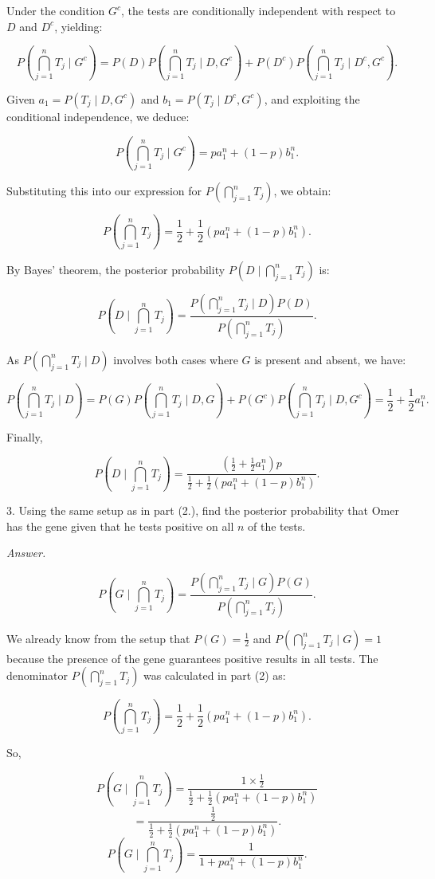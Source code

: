 \documentclass[12pt]{article}
\begin{document}
Under the condition \(G^c\), the tests are conditionally independent with respect to \(D\) and \(D^c\), yielding:

\[ P(\bigcap_{j=1}^n T_j \mid G^c) = P(D)P(\bigcap_{j=1}^n T_j \mid D, G^c) + P(D^c)P(\bigcap_{j=1}^n T_j \mid D^c, G^c). \]

Given \(a_1 = P(T_j \mid D, G^c)\) and \(b_1 = P(T_j \mid D^c, G^c)\), and exploiting the conditional independence, we deduce:

\[ P(\bigcap_{j=1}^n T_j \mid G^c) = pa_1^n + (1-p)b_1^n. \]

Substituting this into our expression for \(P(\bigcap_{j=1}^n T_j)\), we obtain:

\[ P(\bigcap_{j=1}^n T_j) = \frac{1}{2} + \frac{1}{2}(pa_1^n + (1-p)b_1^n). \]

By Bayes' theorem, the posterior probability \(P(D \mid \bigcap_{j=1}^n T_j)\) is:

\[ P(D \mid \bigcap_{j=1}^n T_j) = \frac{P(\bigcap_{j=1}^n T_j \mid D)P(D)}{P(\bigcap_{j=1}^n T_j)}. \]

As \(P(\bigcap_{j=1}^n T_j \mid D)\) involves both cases where \(G\) is present and absent, we have:

\[ P(\bigcap_{j=1}^n T_j \mid D) = P(G)P(\bigcap_{j=1}^n T_j \mid D, G) + P(G^c)P(\bigcap_{j=1}^n T_j \mid D, G^c) = \frac{1}{2} + \frac{1}{2}a_1^n. \]

Finally,

\[ P(D \mid \bigcap_{j=1}^n T_j) = \frac{(\frac{1}{2} + \frac{1}{2}a_1^n)p}{\frac{1}{2} + \frac{1}{2}(pa_1^n + (1-p)b_1^n)}. \]
\newpage
\begin{q}
3. Using the same setup as in part (2.), find the posterior probability that Omer has the gene given that he tests positive on all \(n\) of the tests.
\end{q}
\textit{Answer.}

\[ P(G \mid \bigcap_{j=1}^n T_j) = \frac{P(\bigcap_{j=1}^n T_j \mid G)P(G)}{P(\bigcap_{j=1}^n T_j)}. \]

We already know from the setup that \( P(G) = \frac{1}{2} \) and \( P(\bigcap_{j=1}^n T_j \mid G) = 1 \) because the presence of the gene guarantees positive results in all tests. The denominator \( P(\bigcap_{j=1}^n T_j) \) was calculated in part (2) as:

\[ P(\bigcap_{j=1}^n T_j) = \frac{1}{2} + \frac{1}{2}(pa_1^n + (1-p)b_1^n). \]

So,

\[ P(G \mid \bigcap_{j=1}^n T_j) = \frac{1 \times \frac{1}{2}}{\frac{1}{2} + \frac{1}{2}(pa_1^n + (1-p)b_1^n)} \]
\[ = \frac{\frac{1}{2}}{\frac{1}{2} + \frac{1}{2}(pa_1^n + (1-p)b_1^n)}. \]
\[ P(G \mid \bigcap_{j=1}^n T_j) = \frac{1}{1 + pa_1^n + (1-p)b_1^n}. \]
\end{document}
